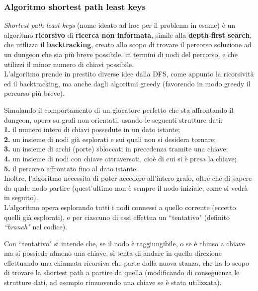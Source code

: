 \documentclass[12pt,titlepage]{article}
\begin{document}
\subsubsection {Algoritmo shortest path least keys}

\textit{Shortest path least keys} (nome ideato ad hoc per il problema in esame) è un algoritmo \textbf{ricorsivo} di \textbf{ricerca non informata}, simile alla \textbf{depth-first search}, che utilizza il \textbf{backtracking}, creato allo scopo di trovare il percorso soluzione ad un dungeon che sia più breve possibile, in termini di nodi del percorso, e che utilizzi il minor numero di chiavi possibile.\\

\noindent L'algoritmo prende in prestito diverse idee dalla DFS, come appunto la ricorsività ed il backtracking, ma anche dagli algoritmi greedy (favorendo in modo greedy il percorso più breve).

Simulando il comportamento di un giocatore perfetto che sta affrontando il dungeon, opera su grafi non orientati, usando le seguenti strutture dati:\\
\textbf{1.} il numero intero di chiavi possedute in un dato istante;\\
\textbf{2.} un insieme di nodi già esplorati e sui quali non si desidera tornare;\\
\textbf{3.} un insieme di archi (porte) sbloccati in precedenza tramite una chiave;\\
\textbf{4.} un insieme di nodi con chiave attraversati, cioè di cui si è presa la chiave;\\
\textbf{5.} il percorso affrontato fino al dato istante.\\
Inoltre, l'algoritmo necessita di poter accedere all'intero grafo, oltre che di sapere da quale nodo partire (quest'ultimo non è sempre il nodo iniziale, come si vedrà in seguito).\\

\noindent L'algoritmo opera esplorando tutti i nodi connessi a quello corrente (eccetto quelli già esplorati), e per ciascuno di essi effettua un ``tentativo" (definito \textit{``branch"} nel codice).

Con ``tentativo" si intende che, se il nodo è raggiungibile, o se è chiuso a chiave ma si possiede almeno una chiave, si tenta di andare in quella direzione effettuando una chiamata ricorsiva che parte dalla nuova stanza, che ha lo scopo di trovare la shortest path a partire da quella (modificando di conseguenza le strutture dati, ad esempio rimuovendo una chiave se è stata utilizzata).
\end{document}
